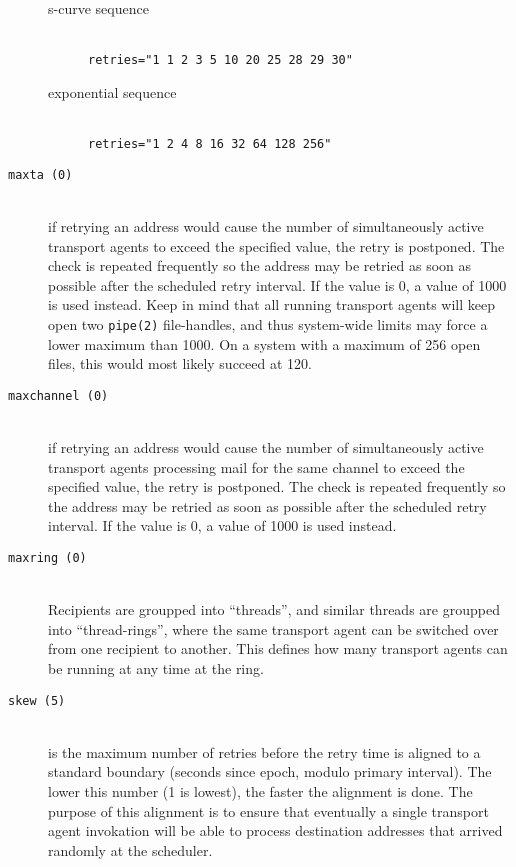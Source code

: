 \begin{description}
\begin{description}
\item[\rm s-curve sequence]\mbox{}\\
{\tt  retries="1 1 2 3 5 10 20 25 28 29 30" }

\item[\rm exponential sequence]\mbox{}\\
{\tt  retries="1 2 4 8 16 32 64 128 256" }

\end{description}

\item[\tt maxta \rm(0)]\mbox{}\\
if retrying an address would cause the number of simultaneously 
active transport agents to exceed the specified  value, the retry is  
postponed. The check is repeated  frequently so  the address may be retried as
soon as possible after the  scheduled  retry interval. If the value is 0, 
a value of 1000 is used instead. Keep in mind that all  running  
transport  agents  will  keep open two {\tt pipe(2)} file-handles, and thus 
system-wide  limits may force a lower maximum than 1000. On a system
with a maximum of 256 open files, this would most likely succeed at 120.

\item[\tt maxchannel \rm(0)]\mbox{}\\
if retrying an address would cause the number of 
simultaneously  active  transport agents processing mail for
the same channel to exceed  the  specified  value,  the
retry  is  postponed.  The check is repeated frequently
so the address may be retried as soon as possible after
the  scheduled  retry  interval.   If the value is 0, a
value of 1000 is used instead.

\item[\tt maxring \rm(0)]\mbox{}\\
Recipients are groupped into ``threads'',  and  similar
threads  are groupped into ``thread-rings'', where the same
transport agent can be switched over from one recipient
to another.  This defines how many transport agents can
be running at any time at the ring.

\item[\tt skew \rm(5)]\mbox{}\\
is the maximum number of retries before the retry  time
is aligned to a standard boundary (seconds since epoch,
modulo primary interval).  The lower this number (1  is
lowest), the faster the alignment is done.  The purpose
of this alignment is to ensure that eventually a single
transport agent invokation will be able to process 
destination addresses that arrived randomly at the  scheduler.


\end{description}
